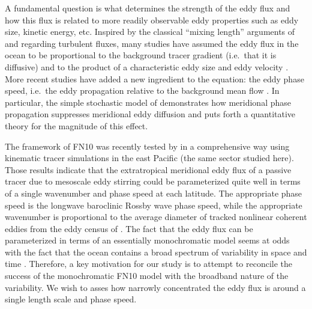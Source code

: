 \documentclass[10pt]{article}
\begin{document}
A fundamental question is what determines the strength of the eddy flux and how this flux is related to more readily observable eddy properties such as eddy size, kinetic energy, etc.
Inspired by the classical ``mixing length'' arguments of \citet{Taylor1915} and \citet{Prandtl1925} regarding turbulent fluxes, many studies have assumed the eddy flux in the ocean to be proportional to the background tracer gradient (i.e.~that it is diffusive) and to the product of a characteristic eddy size and eddy velocity \citep[e.g.][]{Holloway1986,KefferHolloway1988,VisbeckEtAl1997,Stammer1998}. More recent studies have added a new ingredient to the equation: the eddy phase speed, i.e.~the eddy propagation relative to the background mean flow \citep{MarshallEtAl2006,SmithMarshall2009,AbernatheyEtAl2010,FerrariNikurashin2010,KlockerEtAl2012a,KlockerEtAl2012b,AbernatheyMarshall2013}. In particular, the simple stochastic model of \citet[][henceforth FN10]{FerrariNikurashin2010} demonstrates how meridional phase propagation suppresses meridional eddy diffusion and puts forth a quantitative theory for the magnitude of this effect.

The framework of FN10 was recently tested by \citet[][henceforth KA14]{KlockerAbernathey2014} in a comprehensive way using kinematic tracer simulations in the east Pacific (the same sector studied here). Those results indicate that the extratropical meridional eddy flux of a passive tracer due to mesoscale eddy stirring could be parameterized quite well in terms of a single wavenumber and phase speed at each latitude. The appropriate phase speed is the longwave baroclinic Rossby wave phase speed, while the appropriate wavenumber is proportional to the average diameter of tracked nonlinear coherent eddies from the eddy census of \citet{CheltonEtAl2011}. The fact that the eddy flux can be parameterized in terms of an essentially monochromatic model seems at odds with the fact that the ocean contains a broad spectrum of variability in space and time \citep{Others,WorthamWunsch2013}. Therefore, a key motivation for our study is to attempt to reconcile the success of the monochromatic FN10 model with the broadband nature of the variability. We wish to asses how narrowly concentrated the eddy flux is around a single length scale and phase speed.
\end{document}
